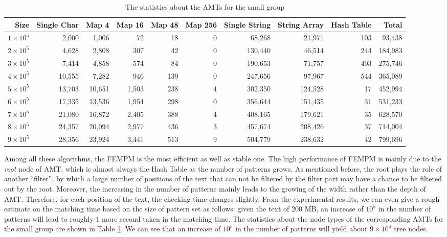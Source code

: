 \begin{table}[!htp]
  \scriptsize
  \caption{The statistics about the AMTs for the small group}
  \label{tab:small}
  \begin{tabular}{rrrrrrrrrr}
 \hline
 Size &
 Single Char &
 Map 4 &
 Map 16 &
 Map 48 &
 Map 256 &
 Single String &
 String Array   &
 Hash Table &
 Total\\
\hline
$1 \times 10^5$  &  2,000 &  1,006 &    72 &  18 & 0 &  68,268 &  21,971 & 103 &  93,438 \\
$2 \times 10^5$ &  4,628 &  2,808 &   307 &  42 & 0 & 130,440 &  46,514 & 244 & 184,983 \\
$3 \times 10^5$ &  7,414 &  4,858 &   574 &  84 & 0 & 190,653 &  71,757 & 403 & 275,746 \\
$4 \times 10^5$ & 10,555 &  7,282 &   946 & 139 & 0 & 247,656 &  97,967 & 544 & 365,089 \\
$5 \times 10^5$ & 13,703 & 10,651 & 1,503 & 238 & 4 & 302,350 & 124,528 &  17 & 452,994 \\
$6 \times 10^5$ & 17,335 & 13,536 & 1,954 & 298 & 0 & 356,644 & 151,435 &  31 & 531,233 \\
$7 \times 10^5$ & 21,080 & 16,872 & 2,405 & 388 & 4 & 408,165 & 179,621 &  35 & 628,570 \\
$8 \times 10^5$ & 24,357 & 20,094 & 2,977 & 436 & 3 & 457,674 & 208,426 &  37 & 714,004 \\
$9 \times 10^5$ & 28,356 & 23,924 & 3,441 & 513 & 9 & 504,779 & 238,632 &  42 & 799,696 \\
\hline
  \end{tabular}
\end{table}

Among all these algorithms, the \textsf{FEMPM} is the most efficient
as well as stable one. The high performance of \textsf{FEMPM} is
mainly due to the \emph{root} node of AMT, which is almost always the
Hash Table as the number of patterns grows. As mentioned before, the
root plays the role of another ``filter'', by which a large number of
positions of the text that can not be filtered by the filter part may
have a chance to be filtered out by the root. Moreover, the increasing
in the number of patterns mainly leads to the growing of the width
rather than the depth of AMT. Therefore, for each position of the
text, the checking time changes slightly. From the experimental
results, we can even give a rough estimate on the matching time based
on the size of pattern set as follows: given the text of 200 MB, an
increase of $10^5$ in the number of patterns will lead to roughly $1$
more second taken in the matching time. The statistics about the node
types of the corresponding AMTs for the small group are shown in Table
\ref{tab:small}. We can see that an increase of $10^5$ in the number
of patterns will yield about $9 \times 10^4$ tree nodes.

